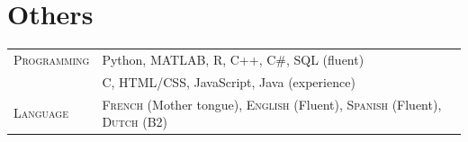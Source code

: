 \documentclass[a4paper,10pt]{article} %
\begin{document}
\section{Others}

\begin{tabular}{p{2.8cm}p{13.5cm}}
\textsc{Programming} & Python, MATLAB, R, C++, C\#, SQL (fluent) \\
                     & C, HTML/CSS, JavaScript, Java (experience) \\
\textsc{Language}    & \textsc{French} (Mother tongue), \textsc{English} (Fluent), \textsc{Spanish} (Fluent), \textsc{Dutch} (B2) \\
\end{tabular}
\end{document}
